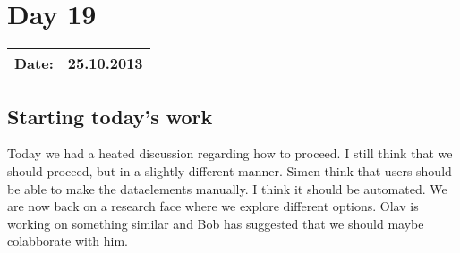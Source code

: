 \section{Day 19}
\begin{tabular}{|c|c|}
\hline
Date: & 25.10.2013 \\
\hline
\end{tabular}
\subsection{Starting today's work}
Today we had a heated discussion regarding how to proceed. I still think that we should proceed, but in a slightly different manner. Simen think that users should be able to make the dataelements manually. I think it should be automated. We are now back on a research face where we explore different options. Olav is working on something similar and Bob has suggested that we should maybe colabborate with him.
